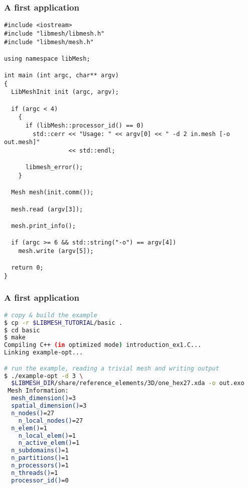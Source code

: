 \begin{frame}
  \frametitle{A first \libMesh{} application}
  \begin{lstlisting}
#include <iostream>
#include "libmesh/libmesh.h"
#include "libmesh/mesh.h"

using namespace libMesh;

int main (int argc, char** argv)
{
  LibMeshInit init (argc, argv);

  if (argc < 4)
    {
      if (libMesh::processor_id() == 0)
        std::cerr << "Usage: " << argv[0] << " -d 2 in.mesh [-o out.mesh]"
                  << std::endl;

      libmesh_error();
    }

  Mesh mesh(init.comm());

  mesh.read (argv[3]);

  mesh.print_info();

  if (argc >= 6 && std::string("-o") == argv[4])
    mesh.write (argv[5]);

  return 0;
}
  \end{lstlisting}
\end{frame}



\begin{frame}
  \frametitle{A first \libMesh{} application}
  \begin{lstlisting}[language=bash]
# copy & build the example
$ cp -r $LIBMESH_TUTORIAL/basic .
$ cd basic
$ make
Compiling C++ (in optimized mode) introduction_ex1.C...
Linking example-opt...

# run the example, reading a trivial mesh and writing output
$ ./example-opt -d 3 \
  $LIBMESH_DIR/share/reference_elements/3D/one_hex27.xda -o out.exo
 Mesh Information:
  mesh_dimension()=3
  spatial_dimension()=3
  n_nodes()=27
    n_local_nodes()=27
  n_elem()=1
    n_local_elem()=1
    n_active_elem()=1
  n_subdomains()=1
  n_partitions()=1
  n_processors()=1
  n_threads()=1
  processor_id()=0
  \end{lstlisting}
\end{frame}
